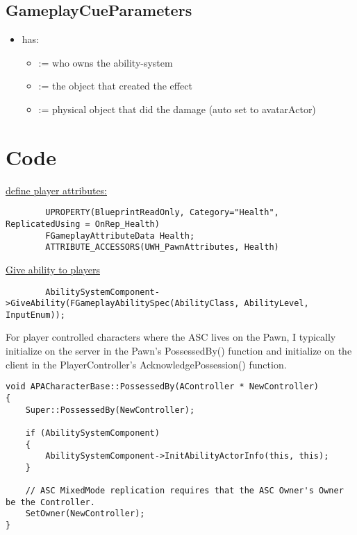         \subsection{GameplayCueParameters}
            \begin{itemize}
                \item has:
                \begin{itemize}
                    \item {} := who owns the ability-system
                    \item {} := the object that created the effect
                    \item {} := physical object that did the damage (auto set to avatarActor)
                \end{itemize}
            \end{itemize}
    
    \section{Code}
        \uline{define player attributes:}
            \begin{lstlisting}
        UPROPERTY(BlueprintReadOnly, Category="Health", ReplicatedUsing = OnRep_Health)
        FGameplayAttributeData Health;
        ATTRIBUTE_ACCESSORS(UWH_PawnAttributes, Health)
            \end{lstlisting}
            \uline{Give ability to players}
            \begin{lstlisting}
        AbilitySystemComponent->GiveAbility(FGameplayAbilitySpec(AbilityClass, AbilityLevel, InputEnum));
            \end{lstlisting}

            For player controlled characters where the ASC lives on the Pawn, I typically initialize on
            the server in the Pawn's PossessedBy() function and initialize on the client in the
            PlayerController's AcknowledgePossession() function.
            \begin{lstlisting}
void APACharacterBase::PossessedBy(AController * NewController)
{
    Super::PossessedBy(NewController);

    if (AbilitySystemComponent)
    {
        AbilitySystemComponent->InitAbilityActorInfo(this, this);
    }

    // ASC MixedMode replication requires that the ASC Owner's Owner be the Controller.
    SetOwner(NewController);
}
        \end{lstlisting}
        
